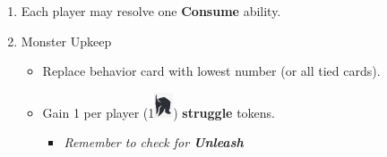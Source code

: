\documentclass[12pt]{article}
\newenvironment{enumerateCustom}
{\begin{enumerate}
  \setlength{\itemsep}{1pt}
  \setlength{\parskip}{0pt}
  \setlength{\parsep}{0pt}}
{\end{enumerate}}
\newenvironment{itemizeCustom}
{\begin{itemize}
  \setlength{\itemsep}{1pt}
  \setlength{\parskip}{0pt}
  \setlength{\parsep}{0pt}}
{\end{itemize}}
\begin{document}
\begin{mdframed}[style=SummaryCard, align=center, userdefinedwidth=35em, frametitle={Round Order Guide}]

    \begin{enumerateCustom}
        \item Each player may resolve one \textbf{Consume} ability.
        \item Monster Upkeep
            \begin{itemizeCustom}
                \item Replace behavior card with lowest number (or all tied cards).
                \item Gain 1 per player (1\includegraphics[scale=0.40]{images/per_player.png}) \textbf{struggle} tokens.
                    \begin{itemizeCustom}
                        \item \textit{Remember to check for \textbf{Unleash}}
                    \end{itemizeCustom}
            \end{itemizeCustom}


\end{enumerateCustom}
\end{mdframed}
\end{document}
